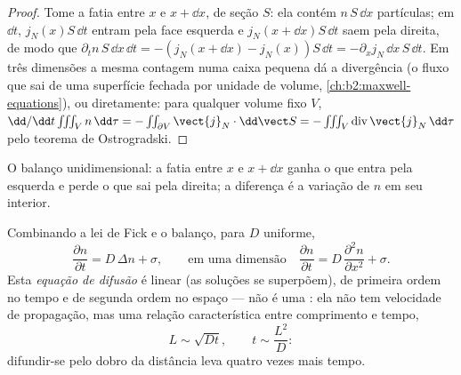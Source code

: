 \begin{proof}
Tome a fatia entre $x$ e $x + \dd x$, de seção $S$: ela contém
$n\,S\,\dd x$ partículas; em $\dd t$, $j_N(x)S\,\dd t$ entram pela
face esquerda e $j_N(x + \dd x)S\,\dd t$ saem pela direita, de modo que
$\partial_t n\,S\,\dd x\,\dd t = -(j_N(x+\dd x) - j_N(x))S\,\dd t =
-\partial_x j_N\,\dd x\,S\,\dd t$. Em três dimensões a mesma contagem numa
caixa pequena dá a divergência (o fluxo que sai de uma superfície fechada por
unidade de volume, \cref{ch:b2:maxwell-equations}), ou diretamente: para qualquer
volume fixo $V$, $\dd/\dd t \iiint_V n\,\dd\tau = -\iint_{\partial V}
\vect{j}_N\cdot\dd\vect S = -\iiint_V \operatorname{div}\vect{j}_N\,\dd\tau$
pelo teorema de Ostrogradski.
\end{proof}

\begin{omfigure}

{\small O balanço unidimensional: a fatia entre $x$ e $x + \dd
x$ ganha o que entra pela esquerda e perde o que sai pela direita;
a diferença é a variação de $n$ em seu interior.}
\end{omfigure}

\begin{theorem}\label{thm:b2:particle-diffusion:equation}
Combinando a lei de Fick e o balanço, para $D$ uniforme,
\[
\frac{\partial n}{\partial t} = D\,\Delta n + \sigma ,
\qquad\text{em uma dimensão}\quad
\frac{\partial n}{\partial t} = D\,\frac{\partial^2 n}{\partial x^2} + \sigma .
\]
Esta \emph{equação de difusão} é linear
(as soluções se superpõem), de primeira ordem no tempo e de segunda ordem no espaço
--- não é uma : ela não tem velocidade de propagação, mas uma
relação característica entre comprimento e tempo,
\[
L \sim \sqrt{D t}, \qquad t \sim \frac{L^2}{D} :
\]
difundir-se pelo dobro da distância leva quatro vezes mais tempo.
\end{theorem}

